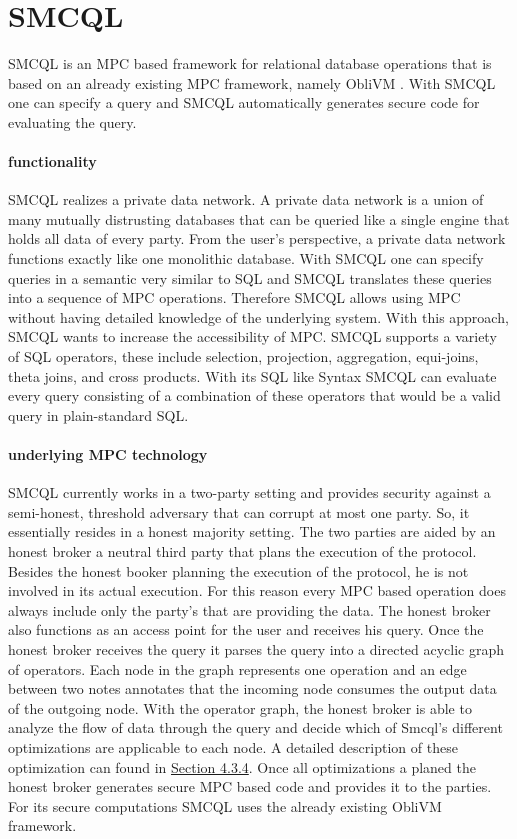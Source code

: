 \section{SMCQL}
SMCQL \cite{bater} is an MPC based framework for relational database operations that is based on an already existing MPC framework, namely ObliVM \cite{liu2015oblivm} . With SMCQL one can specify a query and SMCQL automatically generates secure code for evaluating the query. 
\paragraph{functionality}
SMCQL realizes a private data network. A private data network is a union of many mutually distrusting databases that can be queried like a single engine that holds all data of every party. From the user's perspective, a private data network functions exactly like one monolithic database. With SMCQL one can specify queries in a semantic very similar to SQL and SMCQL translates these queries into a sequence of MPC operations. Therefore SMCQL allows using MPC without having detailed knowledge of the underlying system. With this approach, SMCQL wants to increase the accessibility of MPC. SMCQL supports a variety of SQL operators, these include selection, projection, aggregation, equi-joins, theta joins, and cross products. With its SQL like Syntax SMCQL can evaluate every query consisting of a combination of these operators that would be a valid query in plain-standard SQL.  


\paragraph{underlying MPC technology}
SMCQL currently works in a two-party setting and provides security against a semi-honest, threshold adversary that can corrupt at most one party.  So, it essentially resides in a honest majority setting. The two parties are aided by an honest broker a neutral third party that plans the execution of the protocol. Besides the honest booker planning the execution of the protocol, he is not involved in its actual execution. For this reason every MPC based operation does always include only the party's that are providing the data.
The honest broker also functions as an access point for the user 
and receives his query. 
Once the honest broker receives the query it parses the query into a directed acyclic graph of operators. Each node in the graph represents one operation and an edge between two notes annotates that the incoming node consumes the output data of the outgoing node. 
With the operator graph, the honest broker is able to analyze the flow of data through the query and decide which of Smcql's different optimizations are applicable to each node. 
A detailed description of these optimization can found in \hyperref[sec:Optimizations_smcql]{Section 4.3.4}. Once all optimizations a planed the honest broker generates secure MPC based code and provides it to the parties. For its secure computations SMCQL uses the already existing ObliVM framework.

